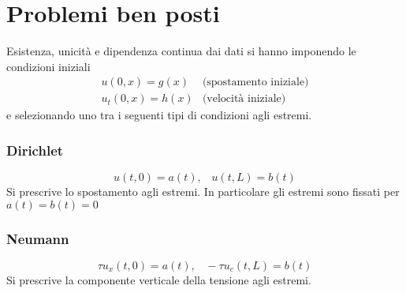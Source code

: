 \section{Problemi ben posti}
Esistenza, unicit\`a e dipendenza continua dai dati si hanno imponendo le 
condizioni iniziali
\[
\begin{array}{ll}
	u(0,x)=g(x) & \text{(spostamento iniziale)}\\
	u_t(0,x)=h(x) & \text{(velocit\`a iniziale)}
\end{array}
\]
e selezionando uno tra i seguenti tipi di condizioni agli estremi.
\subsubsection{Dirichlet}
\[
	u(t,0)=a(t), \;\;\; u(t,L)=b(t)
\]
Si prescrive lo spostamento agli estremi.
In particolare gli estremi sono fissati per $a(t)= b(t)=0$
\subsubsection{Neumann}
\[
	\tau u_x(t,0)=a(t), \;\;\; -\tau u_c (t,L)=b(t)
\]
Si prescrive la componente verticale della tensione agli estremi.
